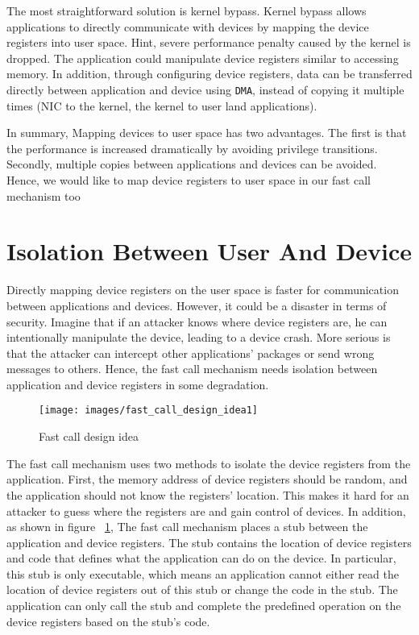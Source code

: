 The most straightforward 
solution is kernel bypass. Kernel bypass allows applications to directly 
communicate with devices by mapping the device registers into user space. 
Hint, severe performance penalty caused by the kernel is dropped. 
The application could manipulate device registers similar to accessing memory. 
In addition, through configuring device registers, data can be 
transferred directly between application and device using \verb|DMA|, 
instead of copying it multiple times (NIC to the kernel, the kernel to user land applications).

In summary, Mapping devices to user space has two advantages. 
The first is that the performance is increased dramatically 
by avoiding privilege transitions. Secondly, multiple copies 
between applications and devices can be avoided. 
Hence, we would like to map device registers to user space 
in our fast call mechanism too

\section{Isolation Between User And Device}



Directly mapping device registers on the user space 
is faster for communication between applications 
and devices. However, it could be a disaster in terms 
of security. Imagine that if an attacker knows where device
 registers are, he can intentionally manipulate the device, 
 leading to a device crash. More serious is that the attacker 
 can intercept other applications' packages or send wrong messages to others.  
Hence, the fast call mechanism needs isolation between application 
and device registers in some degradation. 

\begin{figure}[tbp]
  \centering
  \texttt{[image: images/fast\_call\_design\_idea1]}
  \caption[Short description]{Fast call design idea}
  \label{fig:fast_call_design_idea1}
\end{figure}

The fast call mechanism uses two methods to isolate the 
device registers from the application. First,  the memory 
address of device registers should be random, and the 
application should not know the registers' location. 
This makes it hard for an attacker to guess where the 
registers are and gain control of devices.  In addition, 
as shown in figure ~\ref{fig:fast_call_design_idea1}, The 
fast call mechanism places a stub between the application 
and device registers. The stub contains the location of device 
registers and code that defines what the application can do on 
the device. In particular, this stub is only executable, which 
means an application cannot either read the location of device 
registers out of this stub or change the code in the stub. 
The application can only call the stub and complete the predefined 
operation on the device registers based on the stub's code. 	 

